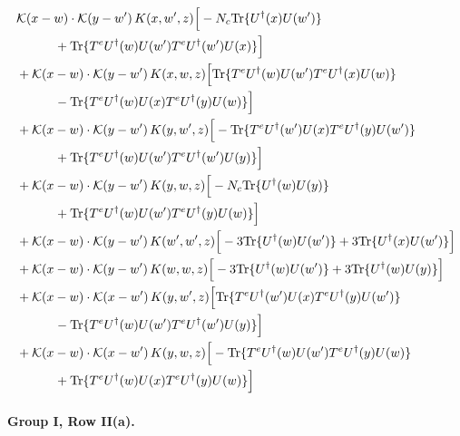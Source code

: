 \documentclass[10pt]{article}
\numberwithin{equation}{section}
\begin{document}
\begin{align}
&\mathcal K(x-w)\cdot\mathcal K(y-w')\,K(x,w',z)\Big[-N_c{\rm Tr}\{U^\dagger(x)U(w')\}\notag\\
&\quad\quad\quad+{\rm Tr}\{T^eU^\dagger(w)U(w')T^eU^\dagger(w')U(x)\}\Big]\notag\\
&+\mathcal K(x-w)\cdot\mathcal K(y-w')\,K(x,w,z)\Big[{\rm Tr}\{T^eU^\dagger(w)U(w')T^eU^\dagger(x)U(w)\}\notag\\
&\quad\quad\quad-{\rm Tr}\{T^eU^\dagger(w)U(x)T^eU^\dagger(y)U(w)\}\Big]\notag\\
&+\mathcal K(x-w)\cdot\mathcal K(y-w')\,K(y,w',z)\Big[-{\rm Tr}\{T^eU^\dagger(w')U(x)T^eU^\dagger(y)U(w')\}\notag\\
&\quad\quad\quad+{\rm Tr}\{T^eU^\dagger(w)U(w')T^eU^\dagger(w')U(y)\}\Big]\notag\\
&+\mathcal K(x-w)\cdot\mathcal K(y-w')\,K(y,w,z)\Big[-N_c{\rm Tr}\{U^\dagger(w)U(y)\}\notag\\
&\quad\quad\quad+{\rm Tr}\{T^eU^\dagger(w)U(w')T^eU^\dagger(y)U(w)\}\Big]\notag\\
&+\mathcal K(x-w)\cdot\mathcal K(y-w')\,K(w',w',z)\Big[-3{\rm Tr}\{U^\dagger(w)U(w')\}+3{\rm Tr}\{U^\dagger(x)U(w')\}\Big]\notag\\
&+\mathcal K(x-w)\cdot\mathcal K(y-w')\,K(w,w,z)\Big[-3{\rm Tr}\{U^\dagger(w)U(w')\}+3{\rm Tr}\{U^\dagger(w)U(y)\}\Big]\notag\\
&+\mathcal K(x-w)\cdot\mathcal K(x-w')\,K(y,w',z)\Big[{\rm Tr}\{T^eU^\dagger(w')U(x)T^eU^\dagger(y)U(w')\}\notag\\
&\quad\quad\quad-{\rm Tr}\{T^eU^\dagger(w)U(w')T^eU^\dagger(w')U(y)\}\Big]\notag\\
&+\mathcal K(x-w)\cdot\mathcal K(x-w')\,K(y,w,z)\Big[-{\rm Tr}\{T^eU^\dagger(w)U(w')T^eU^\dagger(y)U(w)\}\notag\\
&\quad\quad\quad+{\rm Tr}\{T^eU^\dagger(w)U(x)T^eU^\dagger(y)U(w)\}\Big]
\label{eq:G1Ip}
\end{align}

\paragraph{Group I, Row II(a).}
\end{document}
